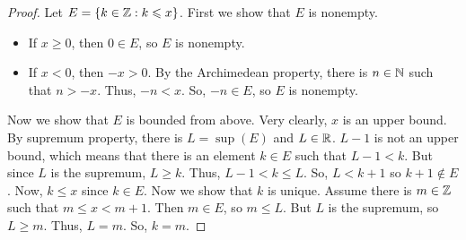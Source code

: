 \documentclass{report}
\begin{document}
\begin{proof}
    Let $E = \{k \in \ZZ : k \leq x\}$. First we show that $E$ is nonempty.
    \begin{itemize}
        \item If $x \geq 0$, then $0 \in E$, so $E$ is nonempty.
        \item If $x < 0$, then $-x > 0$. By the Archimedean property, there is $n \in \NN$ such that $n > -x$. Thus, $-n < x$. So, $-n \in E$, so $E$ is nonempty.
    \end{itemize}
    Now we show that $E$ is bounded from above. Very clearly, $x$ is an upper bound. By supremum property, there is $L = \sup(E)$ and $L \in \RR$. $L-1$ is not an upper bound, which means that there is an element $k \in E$ such that $L-1 < k$. But since $L$ is the supremum, $L \geq k$. Thus, $L-1 < k \leq L$. So, $L < k+1$ so $k + 1 \notin E$. Now, $k \leq x$ since $k \in E$.  Now we show that $k$ is unique. Assume there is $m \in \ZZ$ such that $m \leq x < m+1$. Then $m \in E$, so $m \leq L$. But $L$ is the supremum, so $L \geq m$. Thus, $L = m$. So, $k = m$.
\end{proof}
\end{document}
